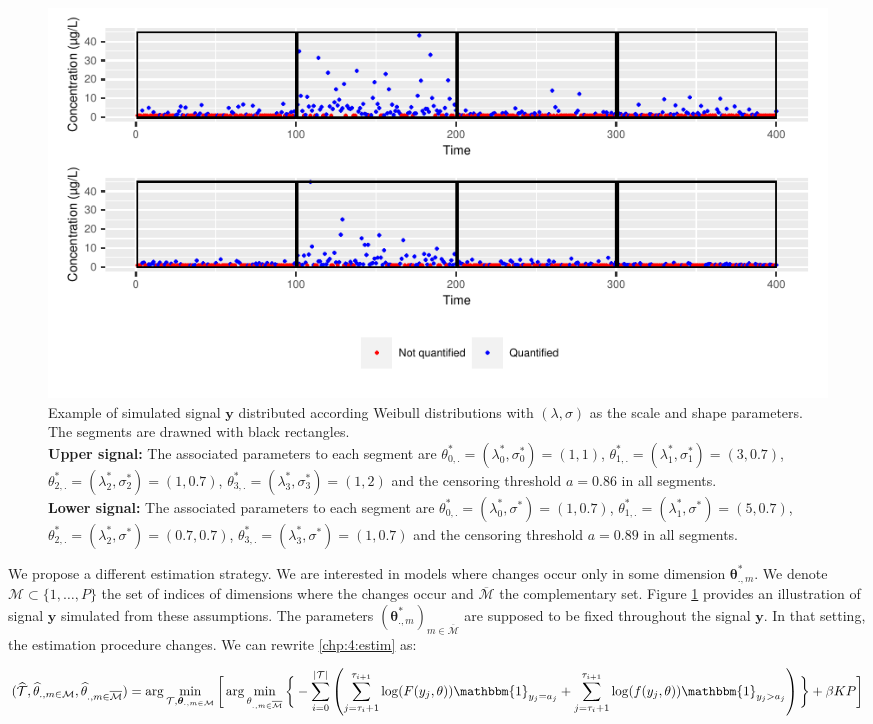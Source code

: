 \begin{figure}[ht]
    \centering
    \includegraphics{figs/Chap4/param_ex.pdf}
    \caption{Example of simulated signal $\bm y$ distributed according Weibull distributions with $(\lambda,\sigma)$ as the scale and shape parameters. The segments are drawned with black rectangles. \\ 
\textbf{Upper signal:} The associated parameters to each segment are $\theta^*_{0,.} = (\lambda^*_0,\sigma^*_0) = (1,1)$, $\theta^*_{1,.} = (\lambda^*_1,\sigma^*_1) = (3,0.7)$, $\theta^*_{2,.} = (\lambda^*_2,\sigma^*_2) = (1,0.7)$, $\theta^*_{3,.} = (\lambda^*_3,\sigma^*_3) = (1,2)$ and the censoring threshold $a = 0.86$ in all segments.\\
\textbf{Lower signal:} The associated parameters to each segment are $\theta^*_{0,.} = (\lambda^*_0,\sigma^*) = (1,0.7)$, $\theta^*_{1,.} = (\lambda^*_1,\sigma^*) = (5,0.7)$, $\theta^*_{2,.} = (\lambda^*_2,\sigma^*) = (0.7,0.7)$, $\theta^*_{3,.} = (\lambda^*_3,\sigma^*) = (1,0.7)$ and the censoring threshold $a = 0.89$ in all segments.}
    \label{fig:param_ex}
\end{figure}

We propose a different estimation strategy. We are interested in models where changes occur only in some dimension $\bm\theta^*_{.,m}$. We denote $\mathcal{M} \subset \{1,\dots,P\}$ the set of indices of dimensions where the changes occur and $\overline{\mathcal{M}}$ the complementary set. Figure \ref{fig:param_ex} provides an illustration of signal $\bm y$ simulated from these assumptions. The parameters $(\bm\theta^*_{.,m})_{m \in \overline{\mathcal{M}}}$ are supposed to be fixed throughout the signal $\bm y$. In that setting, the estimation procedure changes. We can rewrite \ref{chp:4:estim} as: 
    
\begin{dmath}\label{chp:4:estimproc}
(\widehat{\TT},\widehat{\theta}_{.,m\in\mathcal{M}},\widehat{\theta}_{.,m\in\overline{\mathcal{M}}}) = \arg\min_{\TT,\bm \theta_{.,m\in\mathcal{M}}}\bigg[\arg\min_{\theta_{.,m\in\overline{\mathcal{M}}}}\bigg\{ - \sum_{i=0}^{\lvert \TT \rvert}  \left(\sum_{j=\tau_i+1}^{\tau_{i+1}}\log(F(y_j,\theta))\mathbbm{1}_{y_j=a_j}+\sum_{j=\tau_i+1}^{\tau_{i+1}}\log(f(y_j,\theta))\mathbbm{1}_{y_j>a_j}\right)\bigg\}+\beta KP \bigg]
\end{dmath}

